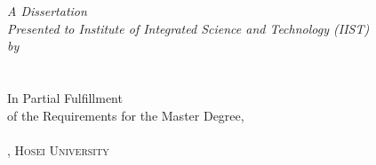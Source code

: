 \begin{titlepage}
\addtocounter{page}{-1}
\begin{center}

\vspace*{.024\textheight}

\vspace{1cm}


{\huge \bfseries \ttitle\par}\vspace{4cm} %
 
 
\vfill

\large \textit{A Dissertation\\Presented to Institute of Integrated Science and Technology (IIST)}\\[0.4cm] %
\textit{by}\\[0.4cm]
\authorname \\
\stuid \\[2.5cm]
In Partial Fulfillment\\of the Requirements for the Master Degree,\\
\deptname \\
\facname, \textsc{Hosei University} \\[1.6cm] %
 

\end{center}
\end{titlepage}
